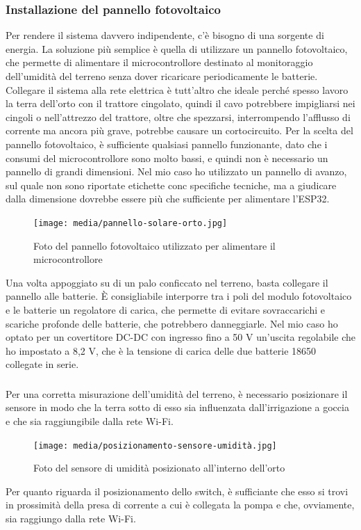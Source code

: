 \documentclass[11pt, a4paper]{article}
\begin{document}
\subsubsection{Installazione del pannello fotovoltaico}
Per rendere il sistema davvero indipendente, c'è bisogno di una sorgente di energia.
La soluzione più semplice è quella di utilizzare un pannello fotovoltaico, che permette
di alimentare il microcontrollore destinato al monitoraggio dell'umidità del terreno senza
dover ricaricare periodicamente le batterie. Collegare il sistema alla rete elettrica è tutt'altro
che ideale perché spesso lavoro la terra dell'orto con il trattore cingolato, quindi il cavo potrebbere
impigliarsi nei cingoli o nell'attrezzo del trattore, oltre che spezzarsi, interrompendo l'afflusso di corrente
ma ancora più grave, potrebbe causare un cortocircuito.
Per la scelta del pannello fotovoltaico, è sufficiente qualsiasi pannello funzionante, dato che i consumi
del microcontrollore sono molto bassi, e quindi non è necessario un pannello di grandi dimensioni.
Nel mio caso ho utilizzato un pannello di avanzo, sul quale non sono riportate etichette conc specifiche tecniche, ma a giudicare dalla
dimensione dovrebbe essere più che sufficiente per alimentare l'ESP32.
\begin{figure}

    \centering
    \texttt{[image: media/pannello-solare-orto.jpg]}
    \caption{Foto del pannello fotovoltaico utilizzato per alimentare il microcontrollore}
    \label{fig:pannello-fotovoltaico}

\end{figure}
Una volta appoggiato su di un palo conficcato nel terreno, basta collegare il pannello alle batterie.
È consigliabile interporre tra i poli del modulo fotovoltaico e le batterie un regolatore di carica, che permette
di evitare sovraccarichi e scariche profonde delle batterie, che potrebbero danneggiarle.
Nel mio caso ho optato per un covertitore DC-DC con ingresso fino a 50 V un'uscita regolabile che ho impostato a 8,2 V,
che è la tensione di carica delle due batterie 18650 collegate in serie.

\subsubsection{\terzaFaseHA}
Per una corretta misurazione dell'umidità del terreno, è necessario posizionare il sensore in modo che
la terra sotto di esso sia influenzata dall'irrigazione a goccia e che sia raggiungibile dalla rete Wi-Fi.
\begin{figure}[H]

    \centering
    \texttt{[image: media/posizionamento-sensore-umidità.jpg]}
    \caption{Foto del sensore di umidità posizionato all'interno dell'orto}
    \label{fig:sensore-umidita-posizionato}

\end{figure}
Per quanto riguarda il posizionamento dello switch, è sufficiante che esso si trovi in prossimità
della presa di corrente a cui è collegata la pompa e che, ovviamente, sia raggiungo dalla rete Wi-Fi.
\end{document}
